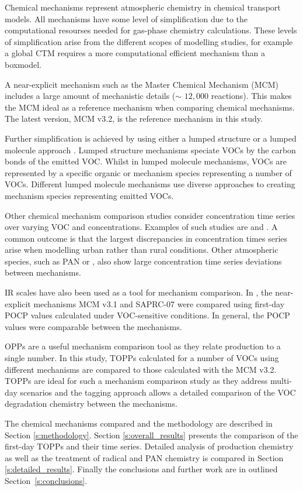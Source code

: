 Chemical mechanisms represent atmospheric chemistry in chemical transport models. 
All mechanisms have some level of simplification due to the computational resourses needed for gas-phase chemistry calculations. 
These levels of simplification arise from the different scopes of modelling studies, for example a global CTM requires a more computational efficient mechanism than a boxmodel. 

A near-explicit mechanism such as the Master Chemical Mechanism (MCM) \citep{Jenkin:2003, Saunders:2003, Bloss:2005} includes a large amount of mechanistic details ($\sim$ $12,000$ reactions). 
This makes the MCM ideal as a reference mechanism when comparing chemical mechanisms. 
The latest version, MCM v3.2, \citep{MCM_Site} is the reference mechanism in this study.

Further simplification is achieved by using either a lumped structure or a lumped molecule approach \citep{Dodge:2000}. 
Lumped structure mechanisms speciate VOCs by the carbon bonds of the emitted VOC. 
Whilst in lumped molecule mechanisms, VOCs are represented by a specific organic or mechanism species representing a number of VOCs. 
Different lumped molecule mechanisms use diverse approaches to creating mechanism species representing emitted VOCs.  

Other chemical mechanism comparison studies consider  concentration time series over varying VOC and  concentrations. 
Examples of such studies are \citet{Dunker:1984, Kuhn:1998, Gross:2003} and \citet{Emmerson:2009}. 
A common outcome is that the largest discrepancies in  concentration times series arise when modelling urban rather than rural conditions. 
Other atmospheric species, such as PAN or , also show large concentration time series deviations between mechanisms.

IR scales have also been used as a tool for mechanism comparison. 
In \citet{Derwent:2010}, the near-explicit mechanisms MCM v3.1 and SAPRC-07 were compared using first-day POCP values calculated under VOC-sensitive conditions. 
In general, the POCP values were comparable between the mechanisms. 

OPPs are a useful mechanism comparison tool as they relate  production to a single number. 
In this study, TOPPs calculated for a number of VOCs using different mechanisms are compared to those calculated with the MCM v3.2. 
TOPPs are ideal for such a mechanism comparison study as they address multi-day scenarios and the tagging approach allows a detailed comparison of the VOC degradation chemistry between the mechanisms.

The chemical mechanisms compared and the methodology are described in Section \ref{s:methodology}. 
Section \ref{s:overall_results} presents the comparison of the first-day TOPPs and their time series. 
Detailed analysis of  production chemistry as well as the treatment of radical and PAN chemistry is compared in Section \ref{s:detailed_results}. 
Finally the conclusions and further work are in outlined \mbox{Section \ref{s:conclusions}}.  
